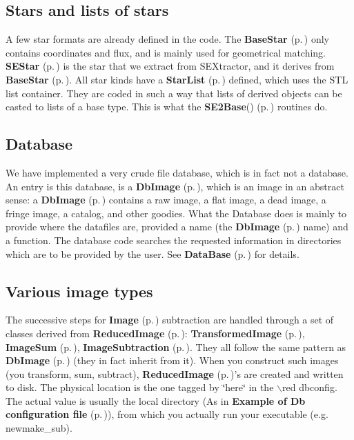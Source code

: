 \subsection{Stars and lists of stars}\label{starlists}
 A few star formats are already defined in the code. The {\bf Base\-Star} {\rm (p.\,\pageref{class_basestar})} only contains  coordinates and flux, and is mainly used for geometrical matching. {\bf SEStar} {\rm (p.\,\pageref{class_sestar})} is the  star that we extract from SEXtractor, and it derives from {\bf Base\-Star} {\rm (p.\,\pageref{class_basestar})}. All star kinds have a {\bf Star\-List} {\rm (p.\,\pageref{class_starlist})} defined, which uses the STL list container. They are coded in such a way that lists of derived objects can be casted to lists of a base type. This is what the {\bf SE2Base}() {\rm (p.\,\pageref{sestar_h_a10})} routines do.

\subsection{Database}\label{database}
 We have implemented a very crude file database, which is in fact not  a database. An entry is this database, is a {\bf Db\-Image} {\rm (p.\,\pageref{class_dbimage})}, which is an image in an abstract sense: a {\bf Db\-Image} {\rm (p.\,\pageref{class_dbimage})} contains a raw image, a flat image, a dead image, a fringe image,  a catalog, and other goodies. What the Database does is mainly to provide  where the datafiles are, provided a name (the {\bf Db\-Image} {\rm (p.\,\pageref{class_dbimage})} name) and a function. The database code searches the requested information in directories  which are to be provided by the user. See {\bf Data\-Base} {\rm (p.\,\pageref{database_page})} for details.

\subsection{Various image types}\label{reducedimage}
 The successive steps for {\bf Image} {\rm (p.\,\pageref{class_image})} subtraction are handled through a set of classes derived from {\bf Reduced\-Image} {\rm (p.\,\pageref{class_reducedimage})}: {\bf Transformed\-Image} {\rm (p.\,\pageref{class_transformedimage})}, {\bf Image\-Sum} {\rm (p.\,\pageref{class_imagesum})}, {\bf Image\-Subtraction} {\rm (p.\,\pageref{class_imagesubtraction})}. They all follow the same pattern as {\bf Db\-Image} {\rm (p.\,\pageref{class_dbimage})} (they in fact inherit from it). When you construct such images (you transform, sum, subtract), {\bf Reduced\-Image} {\rm (p.\,\pageref{class_reducedimage})}'s are created and written to disk. The physical location is the one tagged by \char`\"{}here\char`\"{} in the $\backslash$red dbconfig. The actual value is usually the local directory (As in {\bf Example of Db configuration file} {\rm (p.\,\pageref{dbconfig_example})}), from which you actually run your executable (e.g. newmake\_\-sub).

